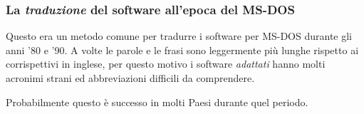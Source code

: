 \subsubsection{La \emph{traduzione} del software all'epoca del MS-DOS}

Questo era un metodo comune per tradurre i software per MS-DOS durante gli anni '80 e '90.
A volte le parole e le frasi sono leggermente più lunghe rispetto ai corrispettivi in inglese, per questo motivo i software \emph{adattati}
hanno molti acronimi strani ed abbreviazioni difficili da comprendere.

Probabilmente questo è successo in molti Paesi durante quel periodo.
